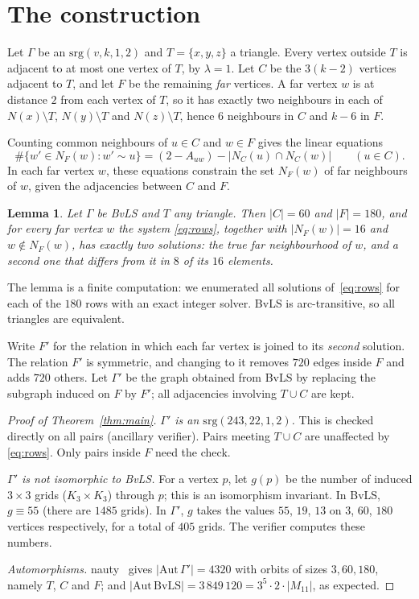 \documentclass[11pt]{amsart}
\newtheorem{lemma}[theorem]{Lemma}
\theoremstyle{remark}
\begin{document}
\section{The construction}
Let $\Gamma$ be an $\mathrm{srg}(v,k,1,2)$ and $T=\{x,y,z\}$ a triangle. Every vertex outside $T$ is adjacent to at most
one vertex of $T$, by $\lambda=1$. Let $C$ be the $3(k-2)$ vertices adjacent to $T$, and let $F$ be the remaining
\emph{far} vertices. A far vertex $w$ is at distance $2$ from each vertex of $T$, so it has exactly two neighbours in each
of $N(x)\setminus T$, $N(y)\setminus T$ and $N(z)\setminus T$, hence $6$ neighbours in $C$ and $k-6$ in $F$.

Counting common neighbours of $u\in C$ and $w\in F$ gives the linear equations
\begin{equation}\label{eq:rows}
\#\{w'\in N_F(w): w'\sim u\}=(2-A_{uw})-|N_C(u)\cap N_C(w)|\qquad(u\in C).
\end{equation}
In each far vertex $w$, these equations constrain the set $N_F(w)$ of far neighbours of $w$, given the adjacencies
between $C$ and $F$.

\begin{lemma}\label{lem:two}
Let $\Gamma$ be BvLS and $T$ any triangle. Then $|C|=60$ and $|F|=180$, and for every far vertex $w$ the system
\eqref{eq:rows}, together with $|N_F(w)|=16$ and $w\notin N_F(w)$, has exactly two solutions: the true far neighbourhood
of $w$, and a second one that differs from it in $8$ of its $16$ elements.
\end{lemma}

The lemma is a finite computation: we enumerated all solutions of~\eqref{eq:rows} for each of the $180$ rows with an
exact integer solver. BvLS is arc-transitive, so all triangles are equivalent.

Write $F'$ for the relation in which each far vertex is joined to its \emph{second} solution. The relation $F'$ is
symmetric, and changing to it removes $720$ edges inside $F$ and adds $720$ others. Let $\Gamma'$ be the graph obtained
from BvLS by replacing the subgraph induced on $F$ by $F'$; all adjacencies involving $T\cup C$ are kept.

\begin{proof}[Proof of Theorem~\ref{thm:main}]
\emph{$\Gamma'$ is an $\mathrm{srg}(243,22,1,2)$.} This is checked directly on all pairs (ancillary verifier). Pairs
meeting $T\cup C$ are unaffected by \eqref{eq:rows}. Only pairs inside $F$ need the check.

\emph{$\Gamma'$ is not isomorphic to BvLS.} For a vertex $p$, let $g(p)$ be the number of induced $3\times3$ grids
($K_3\times K_3$) through $p$; this is an isomorphism invariant. In BvLS, $g\equiv55$ (there are $1485$ grids). In
$\Gamma'$, $g$ takes the values $55$, $19$, $13$ on $3$, $60$, $180$ vertices respectively, for a total of $405$
grids. The verifier computes these numbers.

\emph{Automorphisms.} nauty~\cite{nauty} gives $|\mathrm{Aut}\,\Gamma'|=4320$ with orbits of sizes $3,60,180$, namely
$T$, $C$ and $F$; and $|\mathrm{Aut}\,\mathrm{BvLS}|=3\,849\,120=3^5\cdot2\cdot|M_{11}|$, as expected.
\end{proof}
\end{document}
